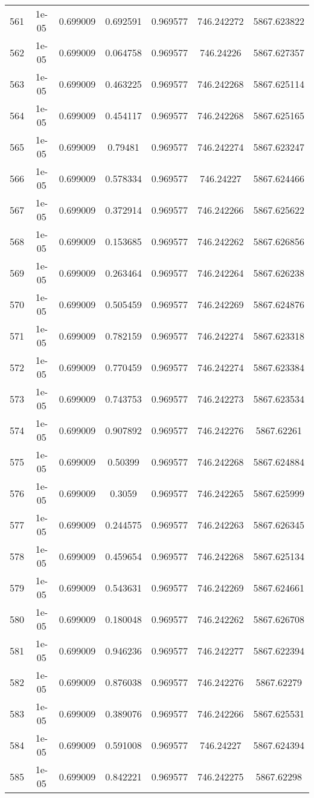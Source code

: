 \begin{table}
\begin{tabular*}{\linewidth}{c|c|c|c|c|c|c}
561 & 1e-05 & 0.699009 & 0.692591 & 0.969577 & 746.242272 & 5867.623822\\
562 & 1e-05 & 0.699009 & 0.064758 & 0.969577 & 746.24226 & 5867.627357\\
563 & 1e-05 & 0.699009 & 0.463225 & 0.969577 & 746.242268 & 5867.625114\\
564 & 1e-05 & 0.699009 & 0.454117 & 0.969577 & 746.242268 & 5867.625165\\
565 & 1e-05 & 0.699009 & 0.79481 & 0.969577 & 746.242274 & 5867.623247\\
566 & 1e-05 & 0.699009 & 0.578334 & 0.969577 & 746.24227 & 5867.624466\\
567 & 1e-05 & 0.699009 & 0.372914 & 0.969577 & 746.242266 & 5867.625622\\
568 & 1e-05 & 0.699009 & 0.153685 & 0.969577 & 746.242262 & 5867.626856\\
569 & 1e-05 & 0.699009 & 0.263464 & 0.969577 & 746.242264 & 5867.626238\\
570 & 1e-05 & 0.699009 & 0.505459 & 0.969577 & 746.242269 & 5867.624876\\
571 & 1e-05 & 0.699009 & 0.782159 & 0.969577 & 746.242274 & 5867.623318\\
572 & 1e-05 & 0.699009 & 0.770459 & 0.969577 & 746.242274 & 5867.623384\\
573 & 1e-05 & 0.699009 & 0.743753 & 0.969577 & 746.242273 & 5867.623534\\
574 & 1e-05 & 0.699009 & 0.907892 & 0.969577 & 746.242276 & 5867.62261\\
575 & 1e-05 & 0.699009 & 0.50399 & 0.969577 & 746.242268 & 5867.624884\\
576 & 1e-05 & 0.699009 & 0.3059 & 0.969577 & 746.242265 & 5867.625999\\
577 & 1e-05 & 0.699009 & 0.244575 & 0.969577 & 746.242263 & 5867.626345\\
578 & 1e-05 & 0.699009 & 0.459654 & 0.969577 & 746.242268 & 5867.625134\\
579 & 1e-05 & 0.699009 & 0.543631 & 0.969577 & 746.242269 & 5867.624661\\
580 & 1e-05 & 0.699009 & 0.180048 & 0.969577 & 746.242262 & 5867.626708\\
581 & 1e-05 & 0.699009 & 0.946236 & 0.969577 & 746.242277 & 5867.622394\\
582 & 1e-05 & 0.699009 & 0.876038 & 0.969577 & 746.242276 & 5867.62279\\
583 & 1e-05 & 0.699009 & 0.389076 & 0.969577 & 746.242266 & 5867.625531\\
584 & 1e-05 & 0.699009 & 0.591008 & 0.969577 & 746.24227 & 5867.624394\\
585 & 1e-05 & 0.699009 & 0.842221 & 0.969577 & 746.242275 & 5867.62298\\
\end{tabular*}
\end{table}
